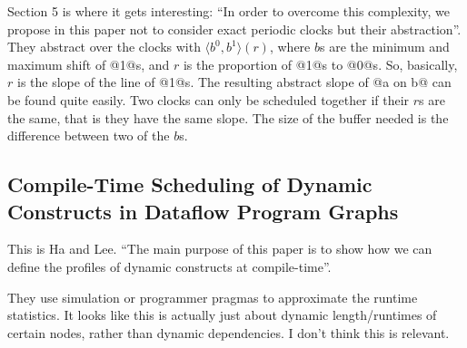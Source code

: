 Section 5 is where it gets interesting: ``In order to overcome this complexity, we propose in this paper not to consider exact periodic clocks but their abstraction''.
They abstract over the clocks with $\langle b^0, b^1 \rangle (r)$, where $b$s are the minimum and maximum shift of @1@s, and $r$ is the proportion of @1@s to @0@s.
So, basically, $r$ is the slope of the line of @1@s. The resulting abstract slope of @a on b@ can be found quite easily.
Two clocks can only be scheduled together if their $r$s are the same, that is they have the same slope.
The size of the buffer needed is the difference between two of the $b$s.

\subsection{Compile-Time Scheduling of Dynamic Constructs in Dataflow Program Graphs}
This is Ha and Lee\cite{ha1997compile}.
``The main purpose of this paper is to show how we can define the profiles of dynamic constructs at compile-time''.

They use simulation or programmer pragmas to approximate the runtime statistics.
It looks like this is actually just about dynamic length/runtimes of certain nodes, rather than dynamic dependencies.
I don't think this is relevant.
